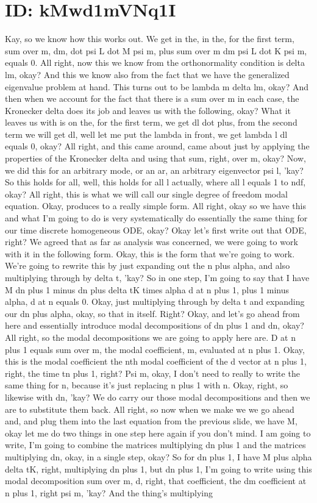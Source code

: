 \documentclass[10pt]{article}
\begin{document}
\section*{ID: kMwd1mVNq1I}
Kay, so we know how this works out. We get in the, in the, for the first term, sum over m, dm, dot psi L dot M psi m, plus sum over m dm psi L dot K psi m, equals 0. All right, now this we know from the orthonormality condition is delta lm, okay? And this we know also from the fact that we have the generalized eigenvalue problem at hand. This turns out to be lambda m delta lm, okay? And then when we account for the fact that there is a sum over m in each case, the Kronecker delta does its job and leaves us with the following, okay? What it leaves us with is on the, for the first term, we get dl dot plus, from the second term we will get dl, well let me put the lambda in front, we get lambda l dl equals 0, okay? All right, and this came around, came about just by applying the properties of the Kronecker delta and using that sum, right, over m, okay? Now, we did this for an arbitrary mode, or an ar, an arbitrary eigenvector psi l, 'kay? So this holds for all, well, this holds for all l actually, where all l equals 1 to ndf, okay? All right, this is what we will call our single degree of freedom modal equation. Okay, produces to a really simple form. All right, okay so we have this and what I'm going to do is very systematically do essentially the same thing for our time discrete homogeneous ODE, okay? Okay let's first write out that ODE, right? We agreed that as far as analysis was concerned, we were going to work with it in the following form. Okay, this is the form that we're going to work. We're going to rewrite this by just expanding out the n plus alpha, and also multiplying through by delta t, 'kay? So in one step, I'm going to say that I have M dn plus 1 minus dn plus delta tK times alpha d at n plus 1, plus 1 minus alpha, d at n equals 0. Okay, just multiplying through by delta t and expanding our dn plus alpha, okay, so that in itself. Right? Okay, and let's go ahead from here and essentially introduce modal decompositions of dn plus 1 and dn, okay? All right, so the modal decompositions we are going to apply here are. D at n plus 1 equals sum over m, the modal coefficient, m, evaluated at n plus 1. Okay, this is the modal coefficient the nth modal coefficient of the d vector at n plus 1, right, the time tn plus 1, right? Psi m, okay, I don't need to really to write the same thing for n, because it's just replacing n plus 1 with n. Okay, right, so likewise with dn, 'kay? We do carry our those modal decompositions and then we are to substitute them back. All right, so now when we make we we go ahead and, and plug them into the last equation from the previous slide, we have M, okay let me do two things in one step here again if you don't mind. I am going to write, I'm going to combine the matrices multiplying dn plus 1 and the matrices multiplying dn, okay, in a single step, okay? So for dn plus 1, I have M plus alpha delta tK, right, multiplying dn plus 1, but dn plus 1, I'm going to write using this modal decomposition sum over m, d, right, that coefficient, the dm coefficient at n plus 1, right psi m, 'kay? And the thing's multiplying 
\end{document}
